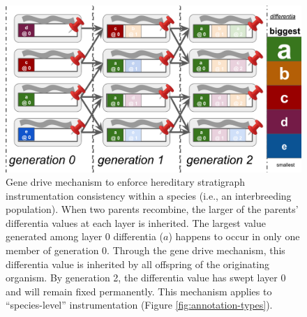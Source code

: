 \begin{figure}
  \centering
  \includegraphics[width=\textwidth]{img/gene-drive}
  \caption{
    Gene drive mechanism to enforce hereditary stratigraph instrumentation consistency within a species (i.e., an interbreeding population).
    When two parents recombine, the larger of the parents' differentia values at each layer is inherited.
    The largest value generated among layer 0 differentia ($a$) happens to occur in only one member of generation 0.
    Through the gene drive mechanism, this differentia value is inherited by all offspring of the originating organism.
    By generation 2, the differentia value has swept layer 0 and will remain fixed permanently.
    This mechanism applies to ``species-level'' instrumentation (Figure \ref{fig:annotation-types}).
  }
  \label{fig:gene-drive}
\end{figure}
